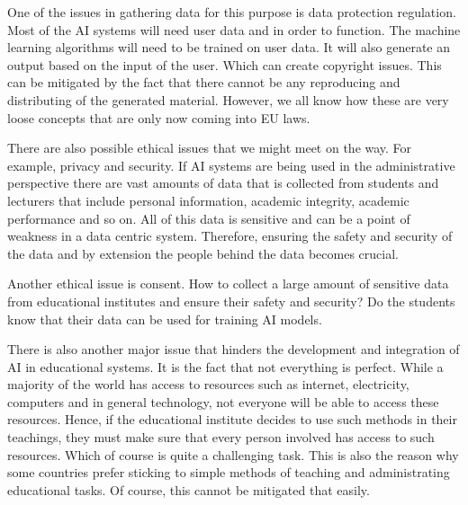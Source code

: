 \documentclass{imc-inf}
\begin{document}
One of the issues in gathering data for this purpose is data protection regulation. Most of the AI systems will need user data and in order to function. The machine learning algorithms will need to be trained on user data. It will also generate an output based on the input of the user. Which can create copyright issues. This can be mitigated by the fact that there cannot be any reproducing and distributing of the generated material. However, we all know how these are very loose concepts that are only now coming into EU laws. 

There are also possible ethical issues that we might meet on the way. For example, privacy and security. If AI systems are being used in the administrative perspective there are vast amounts of data that is collected from students and lecturers that include personal information, academic integrity, academic performance and so on. All of this data is sensitive and can be a point of weakness in a data centric system. Therefore, ensuring the safety and security of the data and by extension the people behind the data becomes crucial. 

Another ethical issue is consent. How to collect a large amount of sensitive data from educational institutes and ensure their safety and security? Do the students know that their data can be used for training AI models. 

There is also another major issue that hinders the development and integration of AI in educational systems. It is the fact that not everything is perfect. While a majority of the world has access to resources such as internet, electricity, computers and in general technology, not everyone will be able to access these resources. Hence, if the educational institute decides to use such methods in their teachings, they must make sure that every person involved has access to such resources. Which of course is quite a challenging task. This is also the reason why some countries prefer sticking to simple methods of teaching and administrating educational tasks. Of course, this cannot be mitigated that easily. 
\end{document}
